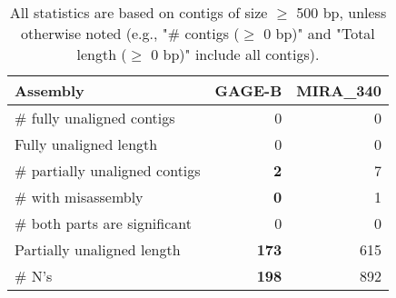 \documentclass[12pt,a4paper]{article}
\begin{document}
\begin{table}[ht]
\begin{center}
\caption{All statistics are based on contigs of size $\geq$ 500 bp, unless otherwise noted (e.g., "\# contigs ($\geq$ 0 bp)" and "Total length ($\geq$ 0 bp)" include all contigs).}
\begin{tabular}{|l*{2}{|r}|}
\hline
Assembly & GAGE-B & MIRA\_340 \\ \hline
\# fully unaligned contigs & 0 & 0 \\ \hline
Fully unaligned length & 0 & 0 \\ \hline
\# partially unaligned contigs & {\bf 2} & 7 \\ \hline
\hspace{5mm}\# with misassembly & {\bf 0} & 1 \\ \hline
\hspace{5mm}\# both parts are significant & 0 & 0 \\ \hline
Partially unaligned length & {\bf 173} & 615 \\ \hline
\# N's & {\bf 198} & 892 \\ \hline
\end{tabular}
\end{center}
\end{table}
\end{document}
